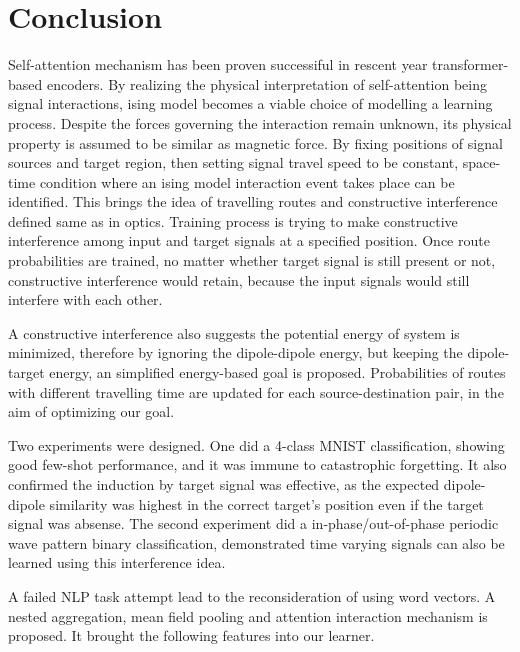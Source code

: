 \documentclass[11pt,a4paper]{article}
\begin{document}
\section{Conclusion}
\begin{multicols}{2}
  Self-attention mechanism has been proven successiful in rescent year transformer-based encoders. By realizing the physical interpretation of self-attention being signal interactions, 
  ising model becomes a viable choice of modelling a learning process. Despite the forces governing the interaction remain unknown, its physical property is assumed to be similar as magnetic force. 
  By fixing positions of signal sources and target region, then setting signal travel speed to be constant, space-time condition where an ising model interaction event takes place can be identified. 
  This brings the idea of travelling routes and constructive interference defined same as in optics. Training process is trying to make constructive interference among input and target signals at a specified position. 
  Once route probabilities are trained, no matter whether target signal is still present or not, constructive interference would retain, because the input signals would still interfere with each other. 

  A constructive interference also suggests the potential energy of system is minimized, therefore by ignoring the dipole-dipole energy, but keeping the dipole-target energy, an simplified energy-based goal is proposed. 
  Probabilities of routes with different travelling time are updated for each source-destination pair, in the aim of optimizing our goal. 

  Two experiments were designed. One did a 4-class MNIST classification, showing good few-shot performance, and it was immune to catastrophic forgetting. 
  It also confirmed the induction by target signal was effective, as the expected dipole-dipole similarity was highest in the correct target's position even if the target signal was absense. 
  The second experiment did a in-phase/out-of-phase periodic wave pattern binary classification, demonstrated time varying signals can also be learned using this interference idea. 

  A failed NLP task attempt lead to the reconsideration of using word vectors. A nested aggregation, mean field pooling and attention interaction mechanism is proposed. It brought the following features into our learner. 


\end{multicols}
\end{document}
